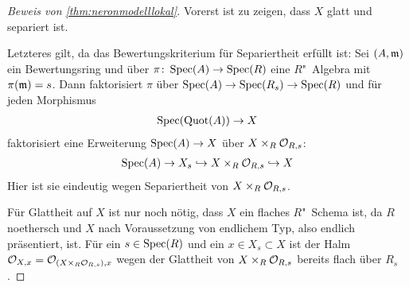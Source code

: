 
\begin{proof}[Beweis von \ref{thm:neronmodelllokal}]
  Vorerst ist zu zeigen, dass $X$ glatt und separiert ist.

  Letzteres gilt, da das Bewertungskriterium für Separiertheit
  erfüllt ist: Sei $(A,\mathfrak{m})$ ein Bewertungsring und über
  ${\pi\colon\operatorname{Spec}(A)\to\operatorname{Spec}(R)}$ eine $R$"~Algebra mit ${\pi(\mathfrak{m})=s}$.
  Dann faktorisiert $\pi$ über
  ${\operatorname{Spec}(A)\to\operatorname{Spec}(R_s)\to\operatorname{Spec}(R)}$ und für jeden Morphismus
  \begin{gather*}
    \operatorname{Spec}(\operatorname{Quot}(A))\to X
  \end{gather*}
  faktorisiert eine Erweiterung ${\operatorname{Spec}(A)\to X}$ über
  ${X\times_R\mathcal{O}_{R,s}}$:
  \begin{gather*}
    \operatorname{Spec}(A)\to X_s\hookrightarrow X\times_R\mathcal{O}_{R,s}\hookrightarrow X
  \end{gather*}
  Hier ist sie eindeutig wegen
  Separiertheit von ${X\times_R\mathcal{O}_{R,s}}$.

  Für Glattheit auf $X$ ist nur noch nötig, dass $X$ ein flaches
  $R$"~Schema ist, da $R$ noethersch und $X$ nach Voraussetzung von
  endlichem Typ, also endlich präsentiert, ist.
  Für ein ${s\in\operatorname{Spec}(R)}$ und ein ${x\in X_s\subset X}$ ist der Halm
  ${\mathcal{O}_{X,x}=\mathcal{O}_{(X\times_R\mathcal{O}_{R,s}),x}}$ wegen der Glattheit von
  ${X\times_R\mathcal{O}_{R,s}}$ bereits flach über $R_s$.


\end{proof}
